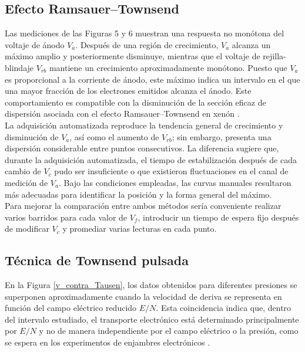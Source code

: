 \subsection*{Efecto Ramsauer--Townsend}

Las mediciones de las Figuras 5 y 6 muestran una respuesta no
monótona del voltaje de ánodo $V_a$. Después de una región de crecimiento,
$V_a$ alcanza un máximo amplio y posteriormente disminuye, mientras que el
voltaje de rejilla-blindaje $V_{rb}$ mantiene un crecimiento aproximadamente
monótono. Puesto que $V_a$ es proporcional a la corriente de ánodo, este
máximo indica un intervalo en el que una mayor fracción de los electrones
emitidos alcanza el ánodo. Este comportamiento es compatible con la disminución de la sección eficaz
de dispersión asociada con el efecto Ramsauer--Townsend en xenón
\cite{Kukolich1968}.\\

La adquisición automatizada reproduce la tendencia general de crecimiento y
disminución de $V_a$, así como el aumento de $V_{rb}$; sin embargo, presenta
una dispersión considerable entre puntos consecutivos. La
diferencia sugiere que, durante la adquisición automatizada, el tiempo de
estabilización después de cada cambio de $V_c$ pudo ser insuficiente o que
existieron fluctuaciones en el canal de medición de $V_a$. Bajo las
condiciones empleadas, las curvas manuales resultaron más adecuadas para
identificar la posición y la forma general del máximo.\\

Para mejorar la comparación entre ambos métodos sería conveniente realizar
varios barridos para cada valor de $V_f$, introducir un tiempo de espera fijo
después de modificar $V_c$ y promediar varias lecturas en cada punto.



\subsection*{Técnica de Townsend pulsada}

En la Figura \ref{v_contra_Tausen}, los datos obtenidos para diferentes presiones se superponen
aproximadamente cuando la velocidad de deriva se representa en función del
campo eléctrico reducido $E/N$. Esta coincidencia indica que, dentro del intervalo estudiado, el transporte
electrónico está determinado principalmente por $E/N$ y no de manera
independiente por el campo eléctrico o la presión, como se espera en los
experimentos de enjambres electrónicos \cite{GonzalezMagana2019}.\\

